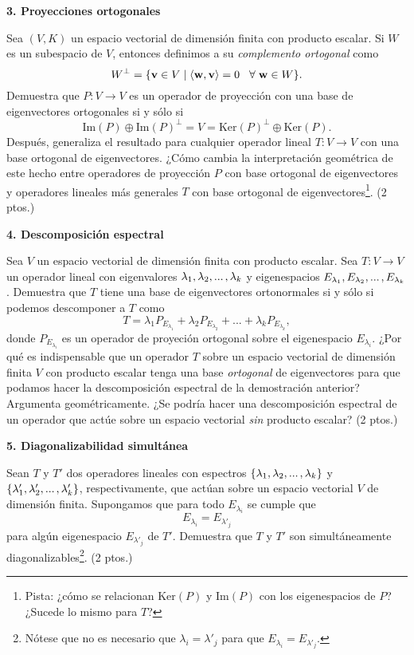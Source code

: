 \documentclass[a4paper]{article}
\begin{document}
\vspace{5mm}
\textbf{3. Proyecciones ortogonales}

Sea $(V,K)$ un espacio vectorial de dimensión finita con producto escalar. Si $W$ es un subespacio de $V$, entonces definimos a su \emph{complemento ortogonal} como $$W^\perp = \{\mathbf{v}\in V\mid \langle \mathbf{w}, \mathbf{v}\rangle = 0\hspace{3mm}\forall\hspace{1mm}\mathbf{w}\in W\}.$$ Demuestra que $P:V\to V$ es un operador de proyección con una base de eigenvectores ortogonales si y sólo si $$\text{Im}(P) \oplus \text{Im}(P)^\perp = V = \text{Ker}(P)^\perp \oplus \text{Ker}(P).$$ Después, generaliza el resultado para cualquier operador lineal $T:V\to V$ con una base ortogonal de eigenvectores. ¿Cómo cambia la interpretación geométrica de este hecho entre operadores de proyección $P$ con base ortogonal de eigenvectores y operadores lineales más generales $T$ con base ortogonal de eigenvectores\footnote{Pista: ¿cómo se relacionan $\text{Ker}(P)$ y $\text{Im}(P)$ con los eigenespacios de $P$? ¿Sucede lo mismo para $T$?}. (2 ptos.)

\vspace{5mm}
\textbf{4. Descomposición espectral}

Sea $V$ un espacio vectorial de dimensión finita con producto escalar. Sea $T:V\to V$ un operador lineal con eigenvalores $\lambda_1, \lambda_2, ...\hspace{0.5mm}, \lambda_k$ y eigenespacios $E_{\lambda_1},E_{\lambda_2},...\hspace{0.5mm},E_{\lambda_k}$. Demuestra que $T$ tiene una base de eigenvectores ortonormales si y sólo si podemos descomponer a $T$ como $$T = \lambda_1 P_{E_{\lambda_1}} + \lambda_2 P_{E_{\lambda_2}}+...+\lambda_k P_{E_{\lambda_k}},$$ donde $P_{E_{\lambda_i}}$ es un operador de proyeción ortogonal sobre el eigenespacio $E_{\lambda_i}$. ¿Por qué es indispensable que un operador $T$ sobre un espacio vectorial de dimensión finita $V$ con producto escalar tenga una base \emph{ortogonal} de eigenvectores para que podamos hacer la descomposición espectral de la demostración anterior? Argumenta geométricamente. ¿Se podría hacer una descomposición espectral de un operador que actúe sobre un espacio vectorial \emph{sin} producto escalar? (2 ptos.)

\vspace{5mm}
\textbf{5. Diagonalizabilidad simultánea}

Sean $T$ y $T'$ dos operadores lineales con espectros $\{\lambda_1,\lambda_2,...\hspace{0.5mm},\lambda_k\}$ y $\{\lambda'_1,\lambda'_2,...\hspace{0.5mm},\lambda'_k\}$, respectivamente, que actúan sobre un espacio vectorial $V$ de dimensión finita. Supongamos que para todo $E_{\lambda_i}$ se cumple que $$E_{\lambda_i}=E_{\lambda'_j}$$ para algún eigenespacio $E_{\lambda'_j}$ de $T'$. Demuestra que $T$ y $T'$ son simultáneamente diagonalizables\footnote{Nótese que no es necesario que $\lambda_i=\lambda'_j$ para que $E_{\lambda_i}=E_{\lambda'_j}.$}. (2 ptos.)
\end{document}
